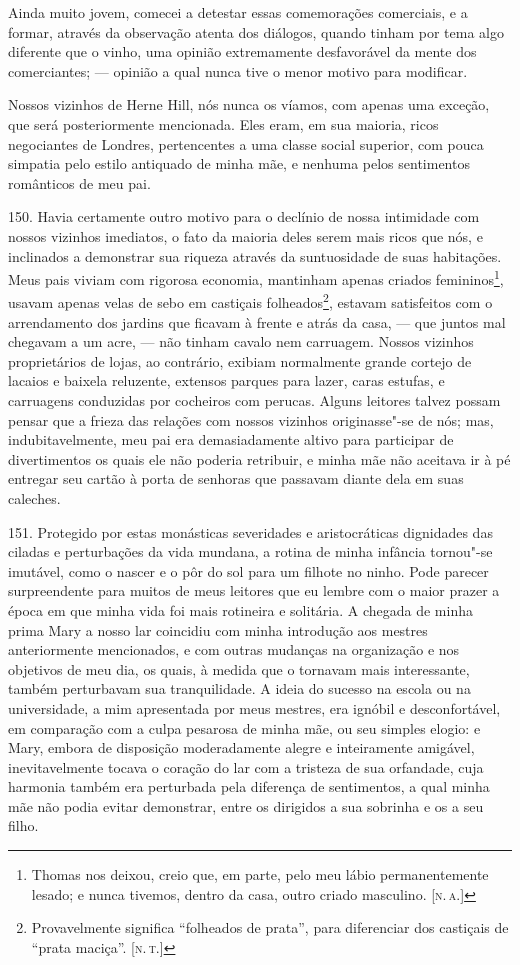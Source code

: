 Ainda muito jovem, comecei a detestar essas comemorações comerciais, e a
formar, através da observação atenta dos diálogos, quando tinham por
tema algo diferente que o vinho, uma opinião extremamente desfavorável
da mente dos comerciantes; --- opinião a qual nunca tive o menor motivo
para modificar.

Nossos vizinhos de Herne Hill, nós nunca os víamos, com apenas uma
exceção, que será posteriormente mencionada. Eles eram, em sua maioria,
ricos negociantes de Londres, pertencentes a uma classe social superior,
com pouca simpatia pelo estilo antiquado de minha mãe, e nenhuma pelos
sentimentos românticos de meu pai.

150. Havia certamente outro motivo para o declínio de nossa intimidade
com nossos vizinhos imediatos, o fato da maioria deles serem mais ricos
que nós, e inclinados a demonstrar sua riqueza através da suntuosidade
de suas habitações. Meus pais viviam com rigorosa economia, mantinham
apenas criados femininos\footnote{Thomas nos deixou, creio que, em
  parte, pelo meu lábio permanentemente lesado; e nunca tivemos, dentro
  da casa, outro criado masculino. {[}\textsc{n.\,a.}{]}}, usavam apenas velas
de sebo em castiçais folheados\footnote{Provavelmente significa
  ``folheados de prata'', para diferenciar dos castiçais de ``prata
  maciça''. {[}\textsc{n.\,t.}{]}}, estavam satisfeitos com o arrendamento dos
jardins que ficavam à frente e atrás da casa, --- que juntos mal chegavam
a um acre, --- não tinham cavalo nem carruagem. Nossos vizinhos
proprietários de lojas, ao contrário, exibiam normalmente grande cortejo
de lacaios e baixela reluzente, extensos parques para lazer, caras
estufas, e carruagens conduzidas por cocheiros com perucas. Alguns
leitores talvez possam pensar que a frieza das relações com nossos
vizinhos originasse"-se de nós; mas, indubitavelmente, meu pai era
demasiadamente altivo para participar de divertimentos os quais ele não
poderia retribuir, e minha mãe não aceitava ir à pé entregar seu cartão
à porta de senhoras que passavam diante dela em suas caleches.

151. Protegido por estas monásticas severidades e aristocráticas
dignidades das ciladas e perturbações da vida mundana, a rotina de minha
infância tornou"-se imutável, como o nascer e o pôr do sol para um
filhote no ninho. Pode parecer surpreendente para muitos de meus
leitores que eu lembre com o maior prazer a época em que minha vida foi
mais rotineira e solitária. A chegada de minha prima Mary a nosso lar
coincidiu com minha introdução aos mestres anteriormente mencionados, e
com outras mudanças na organização e nos objetivos de meu dia, os quais,
à medida que o tornavam mais interessante, também perturbavam sua
tranquilidade. A ideia do sucesso na escola ou na universidade, a mim
apresentada por meus mestres, era ignóbil e desconfortável, em
comparação com a culpa pesarosa de minha mãe, ou seu simples elogio: e
Mary, embora de disposição moderadamente alegre e inteiramente amigável,
inevitavelmente tocava o coração do lar com a tristeza de sua orfandade,
cuja harmonia também era perturbada pela diferença de sentimentos, a
qual minha mãe não podia evitar demonstrar, entre os dirigidos a sua
sobrinha e os a seu filho.


